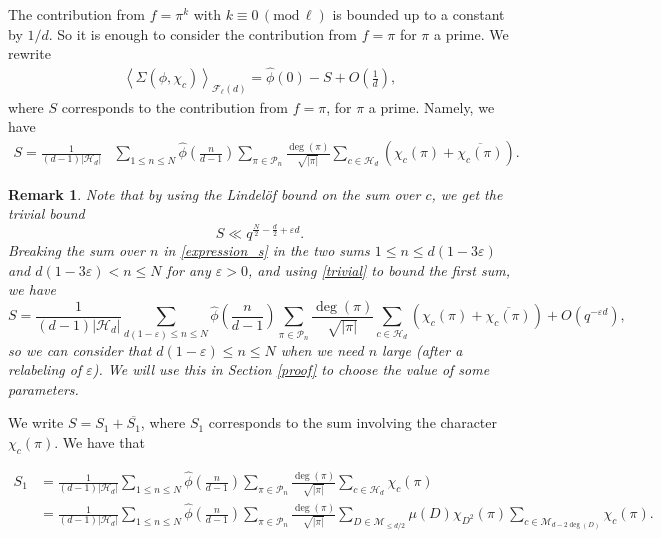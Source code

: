\documentclass[12pt]{amsart}
\newtheorem{remark}[theorem]{Remark}
\renewcommand{\pmod}[1]{\,(\mathrm{mod}\,#1)}
\begin{document}
The contribution from $f=\pi^k$ with $k \equiv 0 \pmod{\ell}$ is bounded up to a constant by $1/d$. 
So it is enough to consider the contribution from $f = \pi$ for $\pi$ a prime. We rewrite
\begin{align}
\label{sigma1avg}
\left\langle\Sigma(\phi,\chi_c)\right\rangle_{\mathcal{F}_\ell(d)} =  \widehat{\phi}(0)- S+O\left(\frac{1}{d}\right),
\end{align}
where $S$ corresponds to the contribution from $f = \pi$, for $\pi$ a prime.
Namely, we have
\begin{align}
\label{expression_s}
S= \frac{1}{(d-1)|\mathcal{H}_d|} & \sum_{1 \leq n\leq N} \widehat{\phi}\left(\frac{n}{d-1}\right) \sum_{ \pi \in \mathcal{P}_{n}} \frac{\deg(\pi)}{\sqrt{|\pi|}} \sum_{c \in \mathcal{H}_d}( \chi_c(\pi)+ \overline{\chi_c(\pi)}) .
\end{align}

\begin{remark} \label{remark-sum-over-n}
 Note that by using the Lindel\"{o}f bound on the sum over $c$, we get the trivial bound
 \begin{equation}
 S \ll q^{\frac{N}{2} - \frac{d}{2}+\varepsilon d}.\label{trivial}
 \end{equation}
Breaking the sum over $n$ in \eqref{expression_s} in the two sums $1 \leq n \leq d(1-3\varepsilon)$ and
$d(1-3\varepsilon) < n \leq N$ for any $\varepsilon >0$, and using \eqref{trivial} to bound the first sum, we have
 $$
 S = \frac{1}{(d-1)|\mathcal{H}_d|}  \sum_{d(1-\varepsilon) \leq n\leq N} \widehat{\phi}\left(\frac{n}{d-1}\right) \sum_{ \pi \in \mathcal{P}_{n}} \frac{\deg(\pi)}{\sqrt{|\pi|}} \sum_{c \in \mathcal{H}_d}( \chi_c(\pi)+ \overline{\chi_c(\pi)})  + O \left(q^{-\varepsilon d} \right),
 $$
 so we can consider that ${d(1-\varepsilon) \leq n\leq N}$ when we need $n$ large (after a relabeling of $\varepsilon$). We will use this in Section \ref{proof} to choose the value of some parameters.
 \end{remark}


We write $S=S_1+\overline{S_1}$, where $S_1$ corresponds to the sum involving the character $\chi_c(\pi)$. We have that 

 \begin{align*}
S_1 &= \frac{1}{(d-1)|\mathcal{H}_d|}  \sum_{1 \leq n\leq N} \widehat{\phi}\left(\frac{n}{d-1}\right) \sum_{ \pi \in \mathcal{P}_{n}} \frac{\deg(\pi)}{\sqrt{|\pi|}} \sum_{c \in \mathcal{H}_d} \chi_c(\pi) \\
 & =  \frac{1}{(d-1)|\mathcal{H}_d|}  \sum_{1 \leq n\leq N} \widehat{\phi}\left(\frac{n}{d-1}\right) \sum_{ \pi \in \mathcal{P}_{n}} \frac{\deg(\pi)}{\sqrt{|\pi|}} \sum_{D \in \mathcal{M}_{\leq d/2}} \mu(D) \chi_{D^2}(\pi) \sum_{c \in \mathcal{M}_{d-2\deg(D)}} \chi_c(\pi).
 \end{align*}
 
\end{document}
